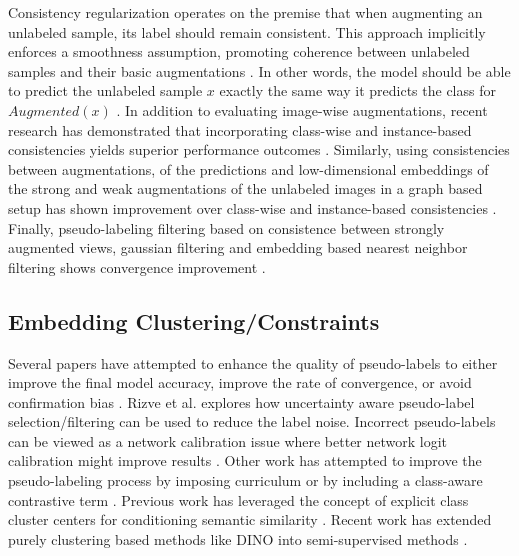 \documentclass[10pt,twocolumn,letterpaper]{article}
\begin{document}
Consistency regularization operates on the premise that when augmenting an unlabeled sample, its label should remain consistent. 
This approach implicitly enforces a smoothness assumption, promoting coherence between unlabeled samples and their basic augmentations \cite{xie2020unsupervised}. 
In other words, the model should be able to predict the unlabeled sample $x$ exactly the same way it predicts the class for $Augmented(x)$ \cite{berthelot2019mixmatch,sohn2020fixmatch,berthelot2019remixmatch,mustafa2020transformation}. 
In addition to evaluating image-wise augmentations, recent research has demonstrated that incorporating class-wise and instance-based consistencies yields superior performance outcomes \cite{zheng2022simmatch,li2021comatch}. 
Similarly, using consistencies between augmentations, of the predictions and low-dimensional embeddings of the strong and weak augmentations of the unlabeled images in a graph based setup has shown improvement over class-wise and instance-based consistencies \cite{zheng2023simmatchv2}.
Finally, pseudo-labeling filtering based on consistence between strongly augmented views, gaussian filtering and embedding based nearest neighbor filtering shows convergence improvement \cite{kim2022conmatch,menon2022semisupervised}.

\subsection{Embedding Clustering/Constraints}


Several papers have attempted to enhance the quality of pseudo-labels to either improve the final model accuracy, improve the rate of convergence, or avoid confirmation bias \cite{arazo2020pseudo}.
Rizve et al. \cite{rizve2021defense} explores how uncertainty aware pseudo-label selection/filtering can be used to reduce the label noise.
Incorrect pseudo-labels can be viewed as a network calibration issue \cite{rizve2021defense} where better network logit calibration might improve results \cite{Xing2020DistanceBased}.
Other work has attempted to improve the pseudo-labeling process by imposing curriculum \cite{zhang2021flexmatch} or by including a class-aware contrastive term \cite{yang2022class}.
Previous work has leveraged the concept of explicit class cluster centers for conditioning semantic similarity \cite{zheng2022simmatch}.
Recent work has extended purely clustering based methods like DINO \cite{caron2021emerging} into semi-supervised methods \cite{fini2023semi}.
\end{document}
